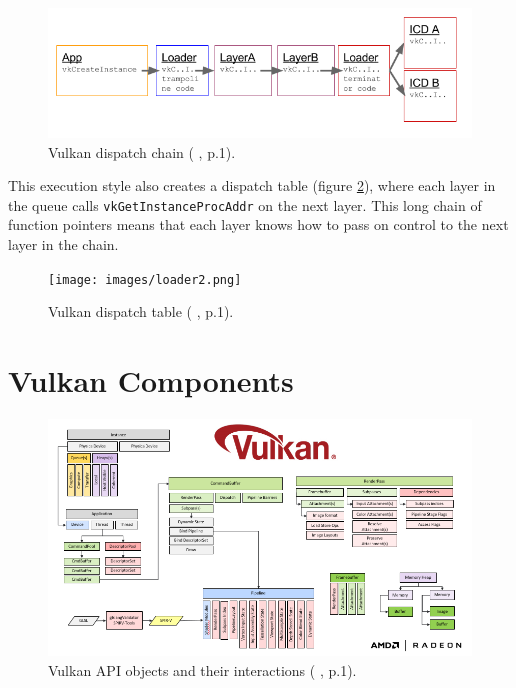 \documentclass[12pt]{report}
\newcommand{\citediagram}[2]{(\citeauthor{#1} \citeyear{#1}, p.#2)}
\theoremstyle{definition}
\begin{document}
      \begin{figure}[h]
        \centering
        \includegraphics[width=\textwidth]{images/loader1.png}
        \caption{Vulkan dispatch chain \citediagram{renderdoc}{1}.}
        \label{fig:loader1}  
      \end{figure}

      This execution style also creates a dispatch table (figure \ref{fig:loader2}), where each layer in
      the queue calls \verb|vkGetInstanceProcAddr| on the next layer. This long
      chain of function pointers means that each layer knows how to pass on
      control to the next layer in the chain. 


      \begin{figure}[h]
        \centering
        \texttt{[image: images/loader2.png]}
        \caption{Vulkan dispatch table \citediagram{renderdoc}{1}.}
        \label{fig:loader2}  
      \end{figure}

    \section{Vulkan Components}

      \begin{figure}[h]
        \centering
        \includegraphics[width=\textwidth]{images/interactions.png}
        \caption{Vulkan API objects and their interactions \citediagram{vez}{1}.}
        \label{fig:interactions}  
      \end{figure}
\end{document}
